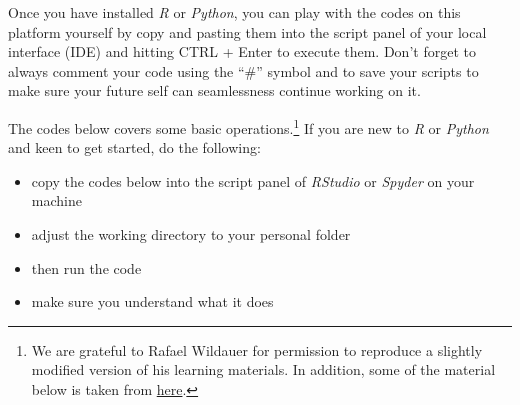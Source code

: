 \documentclass[
  letterpaper,
  DIV=11,
  numbers=noendperiod]{scrreprt}
\providecommand{\tightlist}{%
  \setlength{\itemsep}{0pt}\setlength{\parskip}{0pt}}\usepackage{longtable,booktabs,array}
\begin{document}
Once you have installed \emph{R} or \emph{Python}, you can play with the
codes on this platform yourself by copy and pasting them into the script
panel of your local interface (IDE) and hitting CTRL + Enter to execute
them. Don't forget to always comment your code using the ``\#'' symbol
and to save your scripts to make sure your future self can seamlessness
continue working on it.

The codes below covers some basic operations.\footnote{We are grateful
  to Rafael Wildauer for permission to reproduce a slightly modified
  version of his learning materials. In addition, some of the material
  below is taken from
  \href{https://www.w3schools.com/r/default.asp}{here}.} If you are new
to \emph{R} or \emph{Python} and keen to get started, do the following:

\begin{itemize}
\tightlist
\item
  copy the codes below into the script panel of \emph{RStudio} or
  \emph{Spyder} on your machine
\item
  adjust the working directory to your personal folder
\item
  then run the code
\item
  make sure you understand what it does
\end{itemize}
\end{document}
